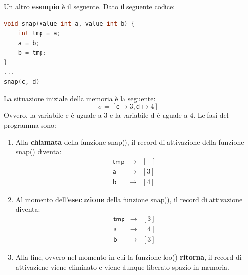 \documentclass[a4paper]{article}
\begin{document}
	\noindent
	Un altro \textcolor{Green4}{\textbf{esempio}} è il seguente. Dato il seguente codice:
	\begin{lstlisting}[language=C]
void snap(value int a, value int b) {
	int tmp = a;
	a = b;
	b = tmp;
}
...
snap(c, d)\end{lstlisting}
	La situazione iniziale della memoria è la seguente:
	\begin{equation*}
		\sigma = \left[\textsf{c} \mapsto 3, \textsf{d} \mapsto 4\right]
	\end{equation*}
	Ovvero, la variabile \textsf{c} è uguale a $3$ e la variabile \textsf{d} è uguale a $4$. Le fasi del programma sono:
	\begin{enumerate}
		\item Alla \textbf{chiamata} della funzione \textsf{snap()}, il record di attivazione della funzione \textsf{snap()} diventa:
		\begin{equation*}
			\begin{array}{lll}
				\textsf{tmp}&\longrightarrow& \left[ \:\:\: \right] \\
				\textsf{a}	&\longrightarrow& \left[ 3 \right] \\
				\textsf{b}	&\longrightarrow& \left[ 4 \right]
			\end{array}
		\end{equation*}
		
		\item Al momento dell'\textbf{esecuzione} della funzione \textsf{snap()}, il record di attivazione diventa:
		\begin{equation*}
			\begin{array}{lll}
				\textsf{tmp}&\longrightarrow& \left[ 3 \right] \\
				\textsf{a}	&\longrightarrow& \left[ 4 \right] \\
				\textsf{b}	&\longrightarrow& \left[ 3 \right]
			\end{array}
		\end{equation*}
		
		\item Alla fine, ovvero nel momento in cui la funzione \textsf{foo()} \textbf{ritorna}, il record di attivazione viene eliminato e viene dunque liberato spazio in memoria.
	\end{enumerate}\newpage
\end{document}
